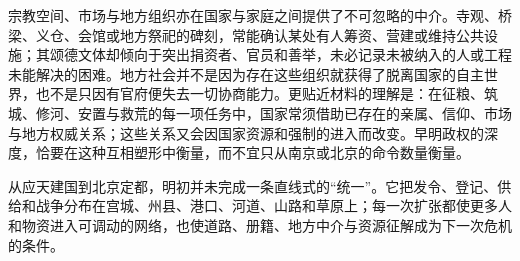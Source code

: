 宗教空间、市场与地方组织亦在国家与家庭之间提供了不可忽略的中介。寺观、桥梁、义仓、会馆或地方祭祀的碑刻，常能确认某处有人筹资、营建或维持公共设施；其颂德文体却倾向于突出捐资者、官员和善举，未必记录未被纳入的人或工程未能解决的困难。地方社会并不是因为存在这些组织就获得了脱离国家的自主世界，也不是只因有官府便失去一切协商能力。更贴近材料的理解是：在征粮、筑城、修河、安置与救荒的每一项任务中，国家常须借助已存在的亲属、信仰、市场与地方权威关系；这些关系又会因国家资源和强制的进入而改变。早明政权的深度，恰要在这种互相塑形中衡量，而不宜只从南京或北京的命令数量衡量。

从应天建国到北京定都，明初并未完成一条直线式的“统一”。它把发令、登记、供给和战争分布在宫城、州县、港口、河道、山路和草原上；每一次扩张都使更多人和物资进入可调动的网络，也使道路、册籍、地方中介与资源征解成为下一次危机的条件。
